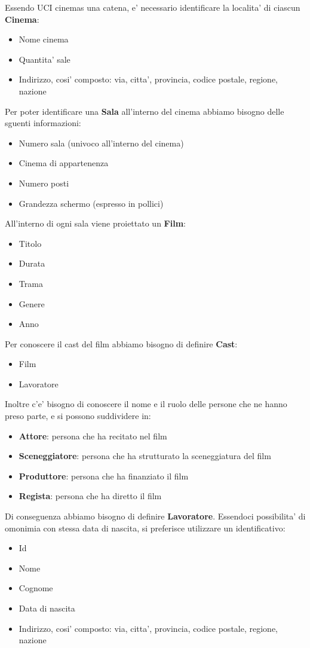 \documentclass[10pt]{article}
\begin{document}
	Essendo UCI cinemas una catena, e' necessario identificare la localita' di ciascun {\bf Cinema}:
	\begin{itemize}
		\item Nome cinema
		\item Quantita' sale
		\item Indirizzo, cosi' composto: via, citta', provincia, codice postale, regione, nazione
	\end{itemize}
	Per poter identificare una {\bf Sala} all'interno del cinema abbiamo bisogno delle sguenti informazioni:
	\begin{itemize}
		\item Numero sala (univoco all'interno del cinema)
		\item Cinema di appartenenza
		\item Numero posti
		\item Grandezza schermo (espresso in pollici)
	\end{itemize}
	All'interno di ogni sala viene proiettato un {\bf Film}:
	\begin{itemize}
		\item Titolo
		\item Durata
		\item Trama
		\item Genere
		\item Anno
	\end{itemize}
	Per conoscere il cast del film abbiamo bisogno di definire \textbf{Cast}:
	\begin{itemize}
		\item Film
		\item Lavoratore
	\end{itemize}
	Inoltre c'e' bisogno di conoscere il nome e il ruolo delle persone che ne hanno preso parte, e si possono suddividere in:
	\begin{itemize}
		\item {\bf Attore}: persona che ha recitato nel film 
		\item {\bf Sceneggiatore}: persona che ha strutturato la sceneggiatura del film 
		\item {\bf Produttore}: persona che ha finanziato il film 
		\item {\bf Regista}: persona che ha diretto il film
	\end{itemize}		 
	Di conseguenza abbiamo bisogno di definire {\bf Lavoratore}. Essendoci possibilita' di omonimia con stessa data di nascita, si preferisce utilizzare un identificativo:
	\begin{itemize}
		\item Id
		\item Nome
		\item Cognome
		\item Data di nascita
		\item Indirizzo, cosi' composto: via, citta', provincia, codice postale, regione, nazione
	\end{itemize}
\end{document}

